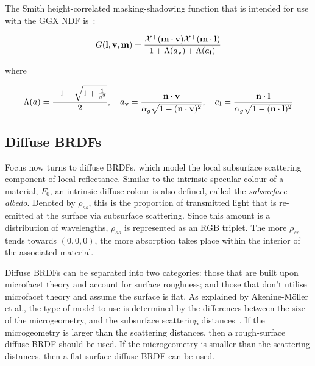 The Smith height-correlated masking-shadowing function that is intended for use with the GGX NDF is~\cite{RTR4}:

\vspace{-0.5cm}

\begin{equation} \label{eq:SmithGGXFunction}
	G(\mathbf{l}, \mathbf{v}, \mathbf{m}) = \frac{\mathcal{X}^+(\mathbf{m}\cdot\mathbf{v})\mathcal{X}^+(\mathbf{m}\cdot\mathbf{l})}{1 + \Lambda(a_{\mathbf{v}}) + \Lambda(a_{\mathbf{l}})}
\end{equation}

where

\vspace{-0.8cm}

\begin{gather*}
	\Lambda(a) = \frac{-1 + \sqrt{1 + \frac{1}{a^2}}}{2},
	\quad
	a_{\mathbf{v}} = \frac{\mathbf{n}\cdot\mathbf{v}}{\alpha_g\sqrt{1 - (\mathbf{n}\cdot\mathbf{v})^2}},
	\quad
	a_{\mathbf{l}} = \frac{\mathbf{n}\cdot\mathbf{l}}{\alpha_g\sqrt{1 - (\mathbf{n}\cdot\mathbf{l})^2}}
\end{gather*}

\subsection{Diffuse BRDFs} \label{DiffuseBRDFs}

Focus now turns to diffuse BRDFs, which model the local subsurface scattering component of local reflectance. Similar to the intrinsic specular colour of a material, \begin{math}F_0\end{math}, an intrinsic diffuse colour is also defined, called the \textit{subsurface albedo}. Denoted by \begin{math}\rho_{ss}\end{math}, this is the proportion of transmitted light that is re-emitted at the surface via subsurface scattering. Since this amount is a distribution of wavelengths, \begin{math}\rho_{ss}\end{math} is represented as an RGB triplet. The more \begin{math}\rho_{ss}\end{math} tends towards \begin{math}(0, 0, 0)\end{math}, the more absorption takes place within the interior of the associated material.

Diffuse BRDFs can be separated into two categories: those that are built upon microfacet theory and account for surface roughness; and those that don't utilise microfacet theory and assume the surface is flat. As explained by Akenine-M\"{o}ller et al., the type of model to use is determined by the differences between the size of the microgeometry, and the subsurface scattering distances~\cite{RTR4}. If the microgeometry is larger than the scattering distances, then a rough-surface diffuse BRDF should be used. If the microgeometry is smaller than the scattering distances, then a flat-surface diffuse BRDF can be used.


